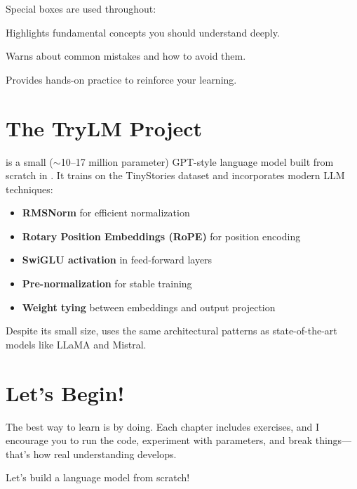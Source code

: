 \documentclass[11pt,a4paper,openany]{book}
\begin{document}
Special boxes are used throughout:

\begin{keypoint}
Highlights fundamental concepts you should understand deeply.
\end{keypoint}

\begin{pitfall}
Warns about common mistakes and how to avoid them.
\end{pitfall}

\begin{exercise}
Provides hands-on practice to reinforce your learning.
\end{exercise}

\section*{The TryLM Project}

\TryLM is a small ($\sim$10--17 million parameter) GPT-style language model built from scratch in \PyTorch. It trains on the TinyStories dataset and incorporates modern LLM techniques:

\begin{itemize}
    \item \textbf{RMSNorm} for efficient normalization
    \item \textbf{Rotary Position Embeddings (RoPE)} for position encoding
    \item \textbf{SwiGLU activation} in feed-forward layers
    \item \textbf{Pre-normalization} for stable training
    \item \textbf{Weight tying} between embeddings and output projection
\end{itemize}

Despite its small size, \TryLM uses the same architectural patterns as state-of-the-art models like LLaMA and Mistral.

\section*{Let's Begin!}

The best way to learn is by doing. Each chapter includes exercises, and I encourage you to run the code, experiment with parameters, and break things---that's how real understanding develops.

Let's build a language model from scratch!

\mainmatter
\end{document}
